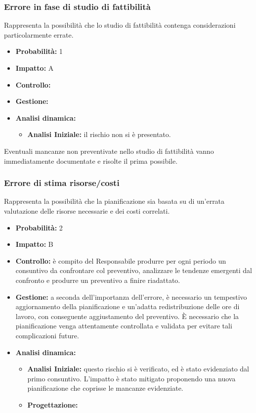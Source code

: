 \documentclass[a4paper,11pt]{article}
\begin{document}
		\subsubsection{Errore in fase di studio di fattibilità}
		Rappresenta la possibilità che lo studio di fattibilità contenga considerazioni particolarmente errate.
		\begin{itemize}
		\item \textbf{Probabilità:} 1
		\item \textbf{Impatto:} A
		\item \textbf{Controllo:}
		\item \textbf{Gestione:}
		\item \textbf{Analisi dinamica:}
			\begin{itemize}
				\item\textbf{Analisi Iniziale:} il rischio non si è presentato.
			\end{itemize}
		\end{itemize}
		Eventuali mancanze non preventivate nello studio di fattibilità vanno immediatamente documentate e risolte il prima possibile.
		\subsubsection{Errore di stima risorse/costi}
		Rappresenta la possibilità che la pianificazione sia basata su di un'errata valutazione delle risorse necessarie e dei costi correlati.
		\begin{itemize}
		\item \textbf{Probabilità:} 2
		\item \textbf{Impatto:} B
		\item \textbf{Controllo:} è compito del Responsabile produrre per ogni periodo un consuntivo da confrontare col preventivo, analizzare le tendenze emergenti dal confronto e produrre un preventivo a finire riadattato. 
		\item \textbf{Gestione:} a seconda dell'importanza dell'errore, è necessario un tempestivo aggiornamento della pianificazione e un'adatta redistribuzione delle ore di lavoro, con conseguente aggiustamento del preventivo. È necessario che la pianificazione venga attentamente controllata e validata per evitare tali complicazioni future.
		\item \textbf{Analisi dinamica:}
			\begin{itemize}
				\item\textbf{Analisi Iniziale:} questo rischio si è verificato, ed è stato evidenziato dal primo consuntivo. L'impatto è stato mitigato proponendo una nuova pianificazione che coprisse le mancanze evidenziate.
				\item\textbf{Progettazione:}
			\end{itemize}
		\end{itemize}
\end{document}
